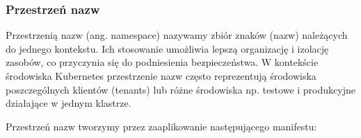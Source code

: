 \subsubsection{Przestrzeń nazw}

Przestrzenią nazw (ang. namespace) nazywamy zbiór znaków (nazw) należących do jednego kontekstu.
Ich stosowanie umożliwia lepszą organizację i izolację zasobów, co przyczynia się do podniesienia bezpieczeństwa.
W kontekście środowiska Kubernetes przestrzenie nazw często reprezentują środowiska poszczególnych klientów (tenants) lub różne środowiska np. testowe i produkcyjne działające w jednym klastrze.

Przestrzeń nazw tworzymy przez zaaplikowanie następującego manifestu:
\inputminted{yaml}{code/store-namespace.yaml}